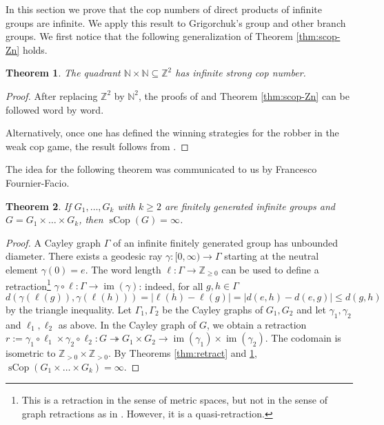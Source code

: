 \documentclass{amsart}
\newtheorem{theorem}{Theorem}[section]
\theoremstyle{definition}
\theoremstyle{remark}
\theoremstyle{remark}
\theoremstyle{definition}
\newcommand{\sCop}{\operatorname{sCop}}
\renewcommand{\leq}{\leqslant}
\renewcommand{\geq}{\geqslant}
\begin{document}
In this section we prove that the cop numbers of direct products of infinite groups are infinite. We apply this result to Grigorchuk's group and other branch groups. We first notice that the following generalization of Theorem \ref{thm:scop-Zn} holds.

\begin{theorem}\label{thm:scop-N2}
    The quadrant $\mathbb{N} \times \mathbb{N} \subseteq \mathbb{Z}^2$ has infinite strong cop number.
\end{theorem}
\begin{proof}
    After replacing $\mathbb{Z}^2$ by $\mathbb{N}^2$, the proofs of \cite[Theorem C]{LMR23} and Theorem \ref{thm:scop-Zn} can be followed word by word. 

		Alternatively, once one has defined the winning strategies for the robber in the weak cop game, the result follows from .
\end{proof}

The idea for the following theorem was communicated to us by Francesco Fournier-Facio.

\begin{theorem}\label{thm:scop-products}
    If $G_1, \ldots, G_k$ with $k\geq 2$ are finitely generated infinite groups and $G=G_1 \times \ldots \times G_k$, then $\sCop(G) = \infty$.
\end{theorem}
\begin{proof}
A Cayley graph $\Gamma$ of an infinite finitely generated group has unbounded diameter. There exists a geodesic ray $\gamma \colon [0, \infty) \to \Gamma$ starting at the neutral element $\gamma(0) = e$. The word length $\ell \colon \Gamma \to \mathbb{Z}_{\geq 0}$ can be used to define a retraction\footnote{This is a retraction in the sense of metric spaces, but not in the sense of graph retractions as in \cite[Example 4.1(2)]{LMR23}. However, it is a quasi-retraction.} $\gamma \circ \ell \colon \Gamma \to \operatorname{im}(\gamma)$: indeed, for all $g,h \in \Gamma$ 
$$
d(\gamma(\ell(g)), \gamma(\ell(h))) = \lvert \ell(h) - \ell(g)\rvert = \vert d(e,h) - d(e,g) \rvert \leq d(g,h)
$$
by the triangle inequality. 
Let $\Gamma_1, \Gamma_2$ be the Cayley graphs of $G_1,G_2$ and let $\gamma_1, \gamma_2 $ and $\ell_1,\ell_2$ as above. 
In the Cayley graph of $G$, we obtain a retraction 
$r := \gamma_1\circ\ell_1 \times \gamma_2 \circ \ell_2\colon G \twoheadrightarrow G_1 \times G_2 \to \operatorname{im}(\gamma_1) \times \operatorname{im}(\gamma_2)$. The codomain is isometric to $\mathbb{Z}_{>0} \times \mathbb{Z}_{>0}$. By Theorems \ref{thm:retract} and \ref{thm:scop-N2}, $\sCop(G_1\times \ldots \times G_k) = \infty$.
\end{proof}
\end{document}
